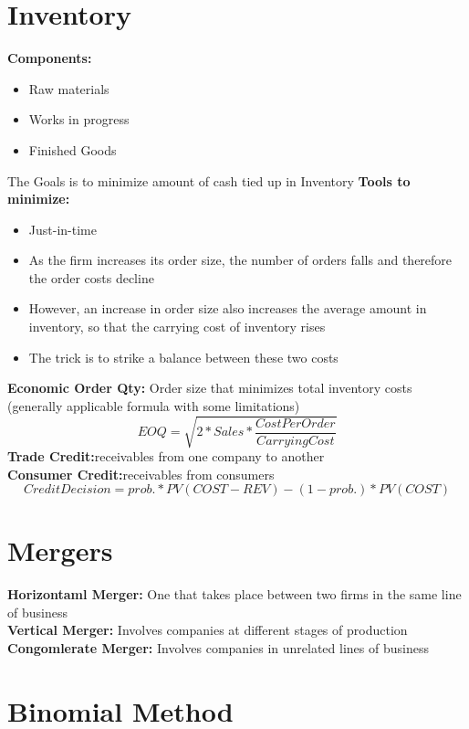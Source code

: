 \documentclass{cheatsheet}
\begin{document}
\section{Inventory}
\textbf{Components:}\begin{itemize}
  \item Raw materials
  \item Works in progress
  \item Finished Goods
\end{itemize}
The Goals is to minimize amount of cash tied up in Inventory
\textbf{Tools to minimize:}\begin{itemize}
  \item Just-in-time
  \item As the firm increases its order size, the number of orders falls and therefore the order costs decline
  \item However, an increase in order size also increases the average amount in inventory, so that the carrying cost of inventory rises
  \item The trick is to strike a balance between these two costs
\end{itemize}
\textbf{Economic Order Qty:} Order size that minimizes total inventory costs (generally applicable formula
with some limitations)
\[EOQ = \sqrt{2*Sales*\frac{CostPerOrder}{CarryingCost}}\]
\textbf{Trade Credit:}receivables from one company to another\\
\textbf{Consumer Credit:}receivables from consumers\\
\[Credit Decision = prob. * PV(COST-REV) - (1-prob.) * PV(COST)\]

\section{Mergers}
\textbf{Horizontaml Merger:} One that takes place between two firms
in the same line of business\\
\textbf{Vertical Merger:} Involves companies at different stages of production\\
\textbf{Congomlerate Merger:} Involves companies in unrelated lines of business\\



\section*{Binomial Method}
\end{document}
